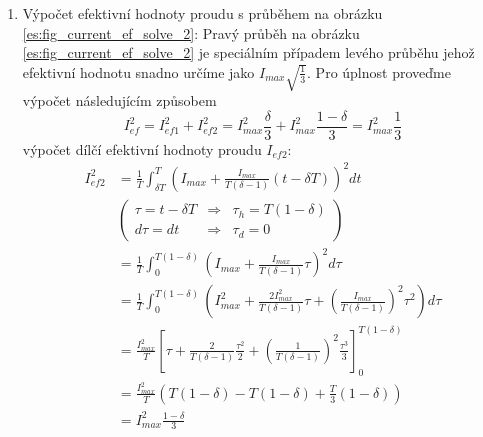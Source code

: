 \begin{enumerate}
      \item Výpočet efektivní hodnoty proudu s průběhem na obrázku \ref{es:fig_current_ef_solve_2}:
            Pravý průběh na obrázku \ref{es:fig_current_ef_solve_2} je speciálním případem levého
            průběhu jehož efektivní hodnotu snadno určíme jako $I_{max}\sqrt{\frac{1}{3}}$. Pro
            úplnost proveďme výpočet následujícím způsobem
        \begin{equation}\label{es:eq_Ief2_solve}
          I_{ef}^2 = I_{ef1}^2+I_{ef2}^2
                   = I_{max}^2\frac{\delta}{3}+I_{max}^2\frac{1-\delta}{3}
                   = I_{max}^2\frac{1}{3}
        \end{equation}
        výpočet dílčí efektivní hodnoty proudu $I_{ef2}$:
        \begin{align*}
          I_{ef2}^2 &=  \frac{1}{T}\int_{\delta T}^{T}{\left(I_{max}+
                        \frac{I_{max}}{T(\delta - 1)}(t-\delta T)\right)^2}dt           \\ 
                    &   \left(\begin{array}{ccc}
                           \tau=t-\delta T  &  \Rightarrow  & \tau_h = T(1-\delta) \\
                          d\tau=dt          &  \Rightarrow  & \tau_d = 0
                        \end{array}\right)                                              \\ 
                    &=  \frac{1}{T}\int_0^{T(1-\delta)}{\left(I_{max}+
                        \frac{I_{max}}{T(\delta-1)}\tau\right)^2}d\tau                  \\ 
                    &=  \frac{1}{T}\int_0^{T(1-\delta)}\left({I_{max}^2+
                        \frac{2I_{max}^2}{T(\delta-1)}\tau+
                        \left(\frac{I_{max}}{T(\delta-1)}
                        \right)^2}\tau^2\right)d\tau                                    \\  
                    &=  \frac{I_{max}^2}{T}\left[{\tau+\frac{2}{T(\delta-1)}
                        \frac{\tau^2}{2}+\left(\frac{1}{T(\delta-1)}\right)^2
                        \frac{\tau^3}{3}}\right]_0^{T(1-\delta)}                        \\ 
                    &=  \frac{I_{max}^2}{T}\left(T(1-\delta)-T(1-\delta)+
                        \frac{T}{3}(1-\delta)\right)                                    \\ 
                    &=  I_{max}^2\frac{1-\delta}{3}                                     \\ 
        \end{align*}


\end{enumerate}
